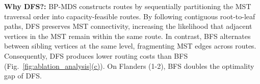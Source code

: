 \textbf{Why DFS?:} BP-MDS constructs routes by sequentially partitioning the MST traversal order into capacity-feasible routes. By following contiguous root-to-leaf paths, DFS preserves MST connectivity, increasing the likelihood that adjacent vertices in the MST remain within the same route. In contrast, BFS alternates between sibling vertices at the same level, fragmenting MST edges across routes. Consequently, DFS produces lower routing costs than BFS (Fig.~\hyperref[fig:ablation_analysis]{\ref*{fig:ablation_analysis}(c)}). On Flanders (1-2), BFS doubles the optimality gap of DFS.




